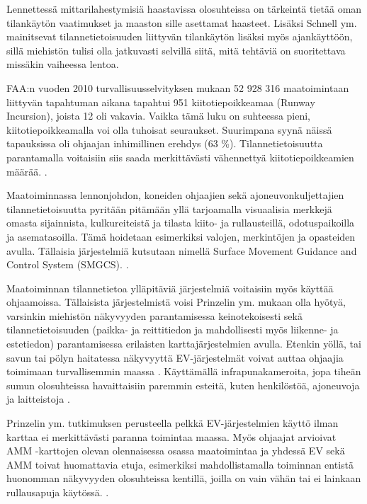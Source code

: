 \documentclass[utf8,bachelor,manualbib]{gradu3}
\begin{document}
Lennettessä mittarilahestymisiä haastavissa olosuhteissa on tärkeintä tietää oman tilankäytön vaatimukset ja maaston sille asettamat haasteet. Lisäksi Schnell ym. \citeyearpar{schnellym2004} mainitsevat tilannetietoisuuden liittyvän tilankäytön lisäksi myös ajankäyttöön, sillä miehistön tulisi olla jatkuvasti selvillä siitä, mitä tehtäviä on suoritettava missäkin vaiheessa lentoa.

FAA:n vuoden 2010 turvallisuusselvityksen mukaan 52 928 316 maatoimintaan liittyvän tapahtuman aikana tapahtui 951 kiitotiepoikkeamaa (Runway Incursion), joista 12 oli vakavia. Vaikka tämä luku on suhteessa pieni, kiitotiepoikkeamalla voi olla tuhoisat seuraukset. Suurimpana syynä näissä tapauksissa oli ohjaajan inhimillinen erehdys (63 \%). Tilannetietoisuutta parantamalla voitaisiin siis saada merkittävästi vähennettyä kiitotiepoikkeamien määrää. \citep{prinzel2013}.

Maatoiminnassa lennonjohdon, koneiden ohjaajien sekä ajoneuvonkuljettajien tilannetietoisuutta pyritään pitämään yllä tarjoamalla visuaalisia merkkejä omasta sijainnista, kulkureiteistä ja tilasta kiito- ja rullausteillä, odotuspaikoilla ja asematasoilla. Tämä hoidetaan esimerkiksi valojen, merkintöjen ja opasteiden avulla. Tällaisia järjestelmiä kutsutaan nimellä Surface Movement Guidance and Control System (SMGCS). \citep{prinzel2013}.

Maatoiminnan tilannetietoa ylläpitäviä järjestelmiä voitaisiin myös käyttää ohjaamoissa. Tällaisista järjestelmistä voisi Prinzelin ym. \citeyearpar{prinzel2013} mukaan olla hyötyä, varsinkin miehistön näkyvyyden parantamisessa keinotekoisesti sekä tilannetietoisuuden (paikka- ja reittitiedon ja mahdollisesti myös liikenne- ja estetiedon) parantamisessa erilaisten karttajärjestelmien avulla. Etenkin yöllä, tai savun tai pölyn haitatessa näkyvyyttä EV-järjestelmät voivat auttaa ohjaajia toimimaan turvallisemmin maassa \citep{prinzel2013}. Käyttämällä infrapunakameroita, jopa tiheän sumun olosuhteissa havaittaisiin paremmin esteitä, kuten henkilöstöä, ajoneuvoja ja laitteistoja \citep{beiergemperlein2004}.

Prinzelin ym. \citeyearpar{prinzel2013} tutkimuksen perusteella pelkkä EV-järjestelmien käyttö ilman karttaa ei merkittävästi paranna toimintaa maassa. Myös ohjaajat arvioivat AMM -karttojen olevan olennaisessa osassa maatoimintaa ja yhdessä EV sekä AMM toivat huomattavia etuja, esimerkiksi mahdollistamalla toiminnan entistä huonomman näkyvyyden olosuhteissa kentillä, joilla on vain vähän tai ei lainkaan rullausapuja käytössä. \citep{prinzel2013}.
\end{document}
